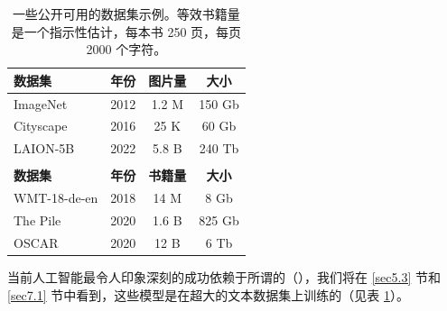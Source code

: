 \begin{table}[h]
	\centering
	\begin{tabular}{lccc}  
		\textbf{数据集} & \textbf{年份} & \textbf{图片量} & \textbf{大小} \\
        \hline
		ImageNet       & 2012          & 1.2 M          & 150 Gb \\
		Cityscape      & 2016          & 25 K           & 60 Gb  \\
		LAION-5B       & 2022          & 5.8 B          & 240 Tb \\
        \\
		\textbf{数据集} & \textbf{年份} & \textbf{书籍量} & \textbf{大小} \\
        \hline
		WMT-18-de-en   & 2018          & 14 M          & 8 Gb    \\
		The Pile       & 2020          & 1.6 B         & 825 Gb  \\
		OSCAR          & 2020          & 12 B          & 6 Tb 
	\end{tabular}
    \caption{一些公开可用的数据集示例。等效书籍量是一个指示性估计，每本书 250 页，每页 2000 个字符。}
	\label{table3.1}
\end{table}

当前人工智能最令人印象深刻的成功依赖于所谓的（），我们将在 \ref{sec5.3} 节和 \ref{sec7.1} 节中看到，这些模型是在超大的文本数据集上训练的（见表 \ref{table3.1}）。
